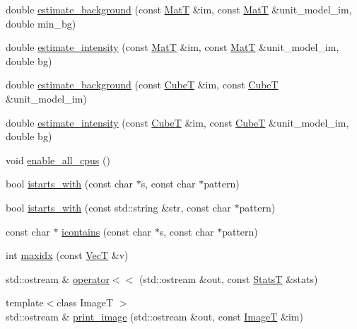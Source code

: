 \begin{DoxyCompactItemize}
double \hyperlink{namespacemappel_ae4735b28fdcd3dafd492d565357f7641}{estimate\+\_\+background} (const \hyperlink{namespacemappel_a7091ab87c528041f7e2027195fad8915}{MatT} \&im, const \hyperlink{namespacemappel_a7091ab87c528041f7e2027195fad8915}{MatT} \&unit\+\_\+model\+\_\+im, double min\+\_\+bg)
\item 
double \hyperlink{namespacemappel_acc51debd218d0e3181f7ddf32576f739}{estimate\+\_\+intensity} (const \hyperlink{namespacemappel_a7091ab87c528041f7e2027195fad8915}{MatT} \&im, const \hyperlink{namespacemappel_a7091ab87c528041f7e2027195fad8915}{MatT} \&unit\+\_\+model\+\_\+im, double bg)
\item 
double \hyperlink{namespacemappel_a5066b92cf654828129635a6ca61aaca4}{estimate\+\_\+background} (const \hyperlink{namespacemappel_ab2afab4e6c8805e83946670d882768c2}{CubeT} \&im, const \hyperlink{namespacemappel_ab2afab4e6c8805e83946670d882768c2}{CubeT} \&unit\+\_\+model\+\_\+im)
\item 
double \hyperlink{namespacemappel_a2d00c518aa213c069f09c666c25b026a}{estimate\+\_\+intensity} (const \hyperlink{namespacemappel_ab2afab4e6c8805e83946670d882768c2}{CubeT} \&im, const \hyperlink{namespacemappel_ab2afab4e6c8805e83946670d882768c2}{CubeT} \&unit\+\_\+model\+\_\+im, double bg)
\item 
void \hyperlink{namespacemappel_aba8aaabfad30754642d7d5ba791e4e37}{enable\+\_\+all\+\_\+cpus} ()
\item 
bool \hyperlink{namespacemappel_a610296a93ba507763bc770d39049f323}{istarts\+\_\+with} (const char $\ast$s, const char $\ast$pattern)
\item 
bool \hyperlink{namespacemappel_ab9264c8a764d4c5f4e3dd4343055d7d3}{istarts\+\_\+with} (const std\+::string \&str, const char $\ast$pattern)
\item 
const char $\ast$ \hyperlink{namespacemappel_aadd3347168b25dd7a097676d342e3ef8}{icontains} (const char $\ast$s, const char $\ast$pattern)
\item 
int \hyperlink{namespacemappel_abd020db8cce0baee03e09251e1a78e78}{maxidx} (const \hyperlink{namespacemappel_a2225ad69f358daa3f4f99282a35b9a3a}{VecT} \&v)
\item 
std\+::ostream \& \hyperlink{namespacemappel_ac61f8d2289377a38008fb499003a3893}{operator$<$$<$} (std\+::ostream \&out, const \hyperlink{namespacemappel_a04ab395b0cf82c4ce68a36b2212649a5}{StatsT} \&stats)
\item 
{\footnotesize template$<$class ImageT $>$ }\\std\+::ostream \& \hyperlink{namespacemappel_a3294759903a1265559b35bc4b487b75b}{print\+\_\+image} (std\+::ostream \&out, const \hyperlink{namespacemappel_a14658186b77757f3c35a69cb1be6cf4b}{ImageT} \&im)

\end{DoxyCompactItemize}
